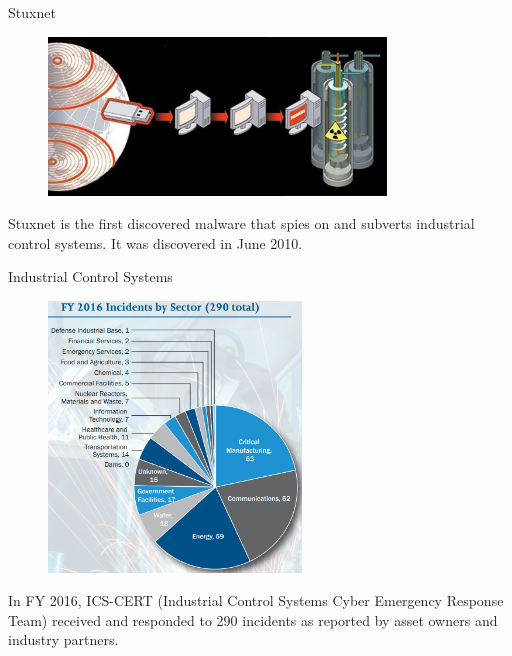 \documentclass[10pt]{beamer}
\begin{document}
\begin{frame}{Stuxnet}
  \begin{figure}[ht]
    \centering
    \includegraphics[width=0.8\textwidth]{stuxnet.jpg}
  \end{figure}
  Stuxnet is the first discovered malware that spies on and subverts industrial control systems. It was discovered in June 2010. 
\end{frame}

\begin{frame}{Industrial Control Systems}
  \begin{figure}[ht]
    \centering
    \includegraphics[width=0.6\textwidth]{cert.jpg}
  \end{figure}
  In FY 2016, ICS-CERT (Industrial Control Systems Cyber Emergency Response Team) received and responded to 290 incidents as reported by asset owners and industry partners.
\end{frame}

%
\end{document}
